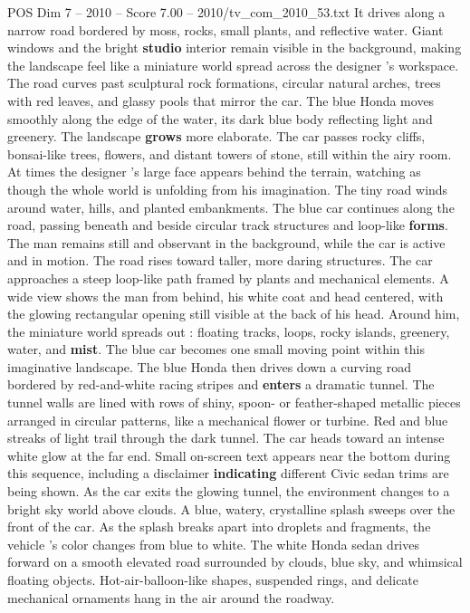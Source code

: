 \begin{textsample}{POS Dim 7 – 2010 – Score 7.00 – 2010/tv\_com\_2010\_53.txt}
It drives along a narrow road bordered by moss, rocks, small plants, and reflective water.
Giant windows and the bright \textbf{studio} interior remain visible in the background, making the landscape feel like a miniature world spread across the designer ’s workspace.
The road curves past sculptural rock formations, circular natural arches, trees with red leaves, and glassy pools that mirror the car.
The blue Honda moves smoothly along the edge of the water, its dark blue body reflecting light and greenery.
The landscape \textbf{grows} more elaborate.
The car passes rocky cliffs, bonsai-like trees, flowers, and distant towers of stone, still within the airy room.
At times the designer ’s large face appears behind the terrain, watching as though the whole world is unfolding from his imagination.
The tiny road winds around water, hills, and planted embankments.
The blue car continues along the road, passing beneath and beside circular track structures and loop-like \textbf{forms}.
The man remains still and observant in the background, while the car is active and in motion.
The road rises toward taller, more daring structures.
The car approaches a steep loop-like path framed by plants and mechanical elements.
A wide view shows the man from behind, his white coat and head centered, with the glowing rectangular opening still visible at the back of his head.
Around him, the miniature world spreads out : floating tracks, loops, rocky islands, greenery, water, and \textbf{mist}.
The blue car becomes one small moving point within this imaginative landscape.
The blue Honda then drives down a curving road bordered by red-and-white racing stripes and \textbf{enters} a dramatic tunnel.
The tunnel walls are lined with rows of shiny, spoon- or feather-shaped metallic pieces arranged in circular patterns, like a mechanical flower or turbine.
Red and blue streaks of light trail through the dark tunnel.
The car heads toward an intense white glow at the far end.
Small on-screen text appears near the bottom during this sequence, including a disclaimer \textbf{indicating} different Civic sedan trims are being shown.
As the car exits the glowing tunnel, the environment changes to a bright sky world above clouds.
A blue, watery, crystalline splash sweeps over the front of the car.
As the splash breaks apart into droplets and fragments, the vehicle ’s color changes from blue to white.
The white Honda sedan drives forward on a smooth elevated road surrounded by clouds, blue sky, and whimsical floating objects.
Hot-air-balloon-like shapes, suspended rings, and delicate mechanical ornaments hang in the air around the roadway.

\end{textsample}
